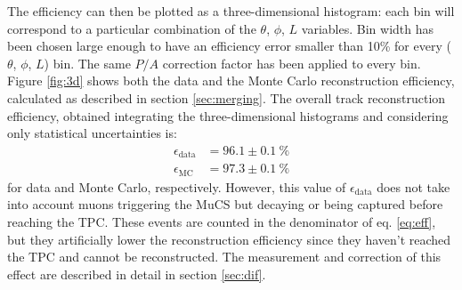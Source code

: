 \documentclass[a4paper,11pt]{article}
\begin{document}
The efficiency can then be plotted as a three-dimensional histogram: each bin will correspond to a particular combination of the $\theta$, $\phi$, $L$ variables. Bin width has been chosen large enough to have an efficiency error smaller than 10\% for every ($\theta$, $\phi$, $L$) bin. The same $P/A$ correction factor has been applied to every bin. Figure \ref{fig:3d} shows both the data and the Monte Carlo reconstruction efficiency, calculated as described in section \ref{sec:merging}. The overall track reconstruction efficiency, obtained integrating the three-dimensional histograms and considering only statistical uncertainties is:
\begin{align*}
\epsilon_{\mathrm{data}} &= 96.1 \pm 0.1~\%\\
\epsilon_{\mathrm{MC}} &= 97.3 \pm 0.1~\%
\end{align*} for data and Monte Carlo, respectively. However, this value of $\epsilon_{\mathrm{data}}$ does not take into account muons triggering the MuCS but decaying or being captured before reaching the TPC. These events are counted in the denominator of eq. \eqref{eq:eff}, but they artificially lower the reconstruction efficiency since they haven't reached the TPC and cannot be reconstructed. The measurement and correction of this effect are described in detail in section \ref{sec:dif}.
\end{document}
